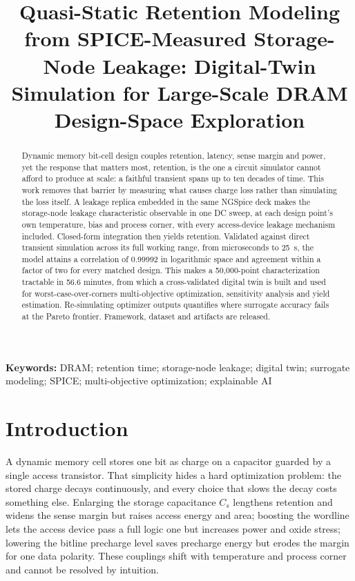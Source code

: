 \documentclass[11pt,a4paper]{article}
\title{\bfseries Quasi-Static Retention Modeling from SPICE-Measured
Storage-Node Leakage: Digital-Twin Simulation for Large-Scale DRAM
Design-Space Exploration}
\author{}
\date{}
\newcommand{\Cs}{C_{s}}
\begin{document}
\maketitle

\begin{abstract}
\noindent
Dynamic memory bit-cell design couples retention, latency, sense margin and
power, yet the response that matters most, retention, is the one a circuit
simulator cannot afford to produce at scale: a faithful transient spans up to
ten decades of time. This work removes that barrier by measuring what causes charge
loss rather than simulating the loss itself. A leakage replica embedded in the
same NGSpice deck makes the storage-node leakage characteristic observable in one
DC sweep, at each design point's own temperature, bias and process corner, with
every access-device leakage mechanism included. Closed-form integration then
yields retention. Validated against direct transient simulation across its full
working range, from microseconds to \SI{25}{\second}, the model attains a
correlation of 0.99992 in logarithmic space and agreement within a factor of two
for every matched design. This makes a 50,000-point
characterization tractable in 56.6 minutes, from which a cross-validated digital
twin is built and used for worst-case-over-corners multi-objective optimization,
sensitivity analysis and yield estimation. Re-simulating optimizer outputs
quantifies where surrogate accuracy fails at the Pareto frontier. Framework,
dataset and artifacts are released.
\end{abstract}

\noindent\textbf{Keywords:} DRAM; retention time; storage-node leakage; digital
twin; surrogate modeling; SPICE; multi-objective optimization; explainable AI

\section{Introduction}
\label{sec:intro}

A dynamic memory cell stores one bit as charge on a capacitor guarded by a single
access transistor. That simplicity hides a hard optimization problem: the stored
charge decays continuously, and every choice that slows the decay costs something
else. Enlarging the storage capacitance $\Cs$ lengthens retention and widens the
sense margin but raises access energy and area; boosting the wordline lets the
access device pass a full logic one but increases power and oxide stress; lowering
the bitline precharge level saves precharge energy but erodes the margin for one
data polarity. These couplings shift with temperature and process corner and
cannot be resolved by intuition.
\end{document}
